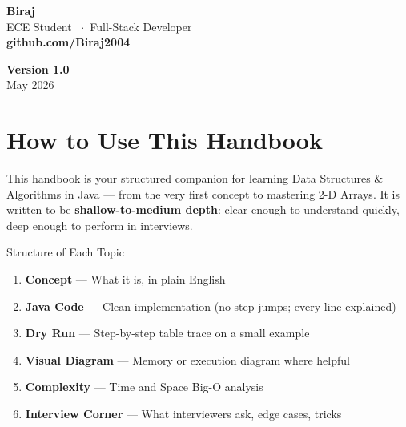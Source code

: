 \documentclass[12pt,a4paper,oneside]{book}
\begin{document}
\begin{titlepage}
\begin{minipage}{0.82\textwidth}
  \begin{minipage}{0.52\textwidth}
    {\LARGE\bfseries\color{black} Biraj}\\[4pt]
    {\normalsize\color{black!70} ECE Student \ $\cdot$\ Full-Stack Developer}\\[4pt]
    {\normalsize\bfseries\color{myred} github.com/Biraj2004}
  \end{minipage}%
  \hfill
  \begin{minipage}{0.40\textwidth}\raggedleft
    {\normalsize\bfseries\color{black} Version 1.0}\\[4pt]
    {\normalsize\color{black!65} May 2026}
  \end{minipage}

  \vspace{0.6cm}

\end{minipage}

\end{titlepage}
\nopagecolor

\frontmatter
\tableofcontents
\clearpage

\chapter*{How to Use This Handbook}

This handbook is your structured companion for learning Data Structures \& Algorithms in Java --- from the very first concept to mastering 2-D Arrays. It is written to be \textbf{shallow-to-medium depth}: clear enough to understand quickly, deep enough to perform in interviews.

\begin{definitionbox}{Structure of Each Topic}
\begin{enumerate}
  \item \textbf{Concept} --- What it is, in plain English
  \item \textbf{Java Code} --- Clean implementation (no step-jumps; every line explained)
  \item \textbf{Dry Run} --- Step-by-step table trace on a small example
  \item \textbf{Visual Diagram} --- Memory or execution diagram where helpful
  \item \textbf{Complexity} --- Time and Space Big-O analysis
  \item \textbf{Interview Corner} --- What interviewers ask, edge cases, tricks
\end{enumerate}
\end{definitionbox}
\end{document}

